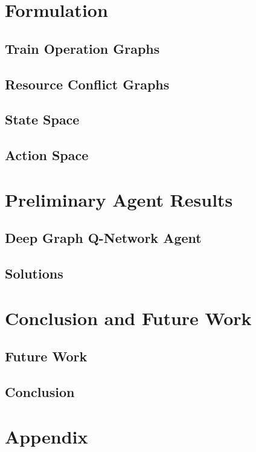\documentclass[runningheads]{llncs}
\begin{document}
\section{Formulation}
\label{sse:formulation}

\subsection{Train Operation Graphs}
\label{sss:train_ops}


\subsection{Resource Conflict Graphs}
\label{sss:resource_conflicts}


\subsection{State Space}
\label{sss:state_space}

\subsection{Action Space}
\label{sss:action_space}

\section{Preliminary Agent Results}
\label{sse:results}

\subsection{Deep Graph Q-Network Agent}
\label{sss:agent}


\subsection{Solutions}
\label{sss:solutions}


\section{Conclusion and Future Work}
\label{sse:conclusion}

\subsection{Future Work}
\label{sss:future_work}

\subsection{Conclusion}
\label{sss:conclusion}


\section{Appendix}





\end{document}
